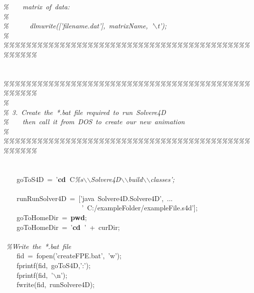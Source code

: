 \documentclass[singlecolumn,12pt]{article}
\newcommand{\hlstd}[1]{\textcolor[rgb]{0,0,0}{#1}}
\newcommand{\hlkey}[1]{\textcolor[rgb]{0,0,1}{\bf{#1}}}
\newcommand{\hltyp}[1]{\textcolor[rgb]{0,0,1}{#1}}
\newcommand{\hlcom}[1]{\textcolor[rgb]{0.4,0.4,0.4}{\it{#1}}}
\begin{document}
{}\hlstd{}\hlcom{\%\hlstd{\ \ \ \ }matrix\ of\ data:\\
}\hlstd{}\hlcom{\%\\
}\hlstd{}\hlcom{\%\hlstd{\ \ \ \ \ \ }dlmwrite(['filename.dat'],\ matrixName,\ '$\backslash$t');\\
}\hlstd{}\hlcom{\%\\
}\hlstd{}\hlcom{\%\%\%\%\%\%\%\%\%\%\%\%\%\%\%\%\%\%\%\%\%\%\%\%\%\%\%\%\%\%\%\%\%\%\%\%\%\%\%\%\%\%\%\%\%\%\%\%\%\%\mbox{}\\
}\hlstd{\mbox{}\\
\\
}\hlcom{\%\%\%\%\%\%\%\%\%\%\%\%\%\%\%\%\%\%\%\%\%\%\%\%\%\%\%\%\%\%\%\%\%\%\%\%\%\%\%\%\%\%\%\%\%\%\%\%\%\%\\
}\hlstd{}\hlcom{\%\\
}\hlstd{}\hlcom{\%\ 3.\ Create\ the\ *.bat\ file\ required\ to\ run\ Solvere4D\\
}\hlstd{}\hlcom{\%\hlstd{\ \ \ \ }then\ call\ it\ from\ DOS\ to\ create\ our\ new\ animation\\
}\hlstd{}\hlcom{\%\\
}\hlstd{}\hlcom{\%\%\%\%\%\%\%\%\%\%\%\%\%\%\%\%\%\%\%\%\%\%\%\%\%\%\%\%\%\%\%\%\%\%\%\%\%\%\%\%\%\%\%\%\%\%\%\%\%\%\mbox{}\\
}\hlstd{\mbox{}\\
\\
\hlstd{\ \ \ \ }goToS4D\ =\ '}\hlkey{cd\ }\hlstd{C}\hlcom{\%s$\backslash$$\backslash$Solvere4D$\backslash$$\backslash$build$\backslash$$\backslash$classes';\mbox{}\\
}\hlstd{\\
\hlstd{\ \ \ \ }runRunSolver4D\ =\ ['java\ Solvere4D.Solvere4D',\ ...\\
\hlstd{\ \ \ \ \ \ \ \ \ \ \ \ \ \ \ \ \ \ \ \ \ \ \ }'\ C:/exampleFolder/exampleFile.s4d'];\\
\hlstd{\ \ \ \ }goToHomeDir\ =\ }\hlkey{pwd}\hlstd{;\\
\hlstd{\ \ \ \ }goToHomeDir\ =\ '}\hlkey{cd\ }\hlstd{'\ +\ curDir;\mbox{}\\
\\
\ }\hlcom{\%Write\ the\ *.bat\ file\\
}\hlstd{\hlstd{\ \ \ \ }fid\ =\ }\hltyp{fopen}\hlstd{('createFPE.bat',\ 'w');\\
\hlstd{\ \ \ \ }}\hltyp{fprintf}\hlstd{(fid,\ goToS4D,':');\\
\hlstd{\ \ \ \ }}\hltyp{fprintf}\hlstd{(fid,\ '$\backslash$n');\\
\hlstd{\ \ \ \ }}\hltyp{fwrite}\hlstd{(fid,\ runSolvere4D);\\
}
\end{document}
